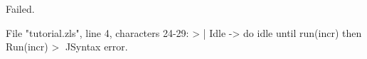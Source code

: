 \runverbatimfalse
{}
\begin{RunVerbatimMsg}
Failed.
\end{RunVerbatimMsg}
\begin{RunVerbatimErr}
File "tutorial.zls", line 4, characters 24-29:
>      | Idle -> do idle until run(incr) then Run(incr)
>                        ^^^^^
Syntax error.
\end{RunVerbatimErr}
